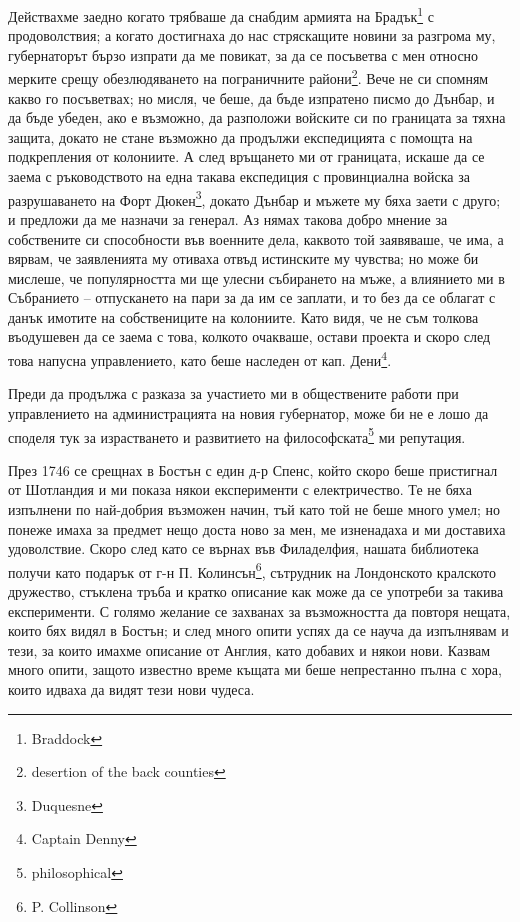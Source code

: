 \documentclass[12pt]{book}
\begin{document}
Действахме заедно когато трябваше да снабдим армията на Брадък\footnote{Braddock} с продоволствия; а когато достигнаха до нас стряскащите новини за разгрома му, губернаторът бързо изпрати да ме повикат, за да се посъветва с мен относно мерките срещу обезлюдяването на пограничните райони\footnote{desertion of the back counties}. Вече не си спомням какво го посъветвах; но мисля, че беше, да бъде изпратено писмо до Дънбар, и да бъде убеден, ако е възможно, да разположи войските си по границата за тяхна защита, докато не стане възможно да продължи експедицията с помощта на подкрепления от колониите. А след връщането ми от границата, искаше да се заема с ръководството на една такава експедиция с провинциална войска за разрушаването на Форт Дюкен\footnote{Duquesne}, докато Дънбар и мъжете му бяха заети с друго; и предложи да ме назначи за генерал. Аз нямах такова добро мнение за собствените си способности във военните дела, каквото той заявяваше, че има, а вярвам, че заявленията му отиваха отвъд истинските му чувства; но може би мислеше, че популярността ми ще улесни събирането на мъже, а влиянието ми в Събранието – отпускането на пари за да им се заплати, и то без да се облагат с данък имотите на собствениците на колониите. Като видя, че не съм толкова въодушевен да се заема с това, колкото очакваше, остави проекта и скоро след това напусна управлението, като беше наследен от кап. Дени\footnote{Captain Denny}.

Преди да продължа с разказа за участието ми в обществените работи при управлението на администрацията на новия губернатор, може би не е лошо да споделя тук за израстването и развитието на философската\footnote{philosophical} ми репутация.

През 1746 се срещнах в Бостън с един д-р Спенс, който скоро беше пристигнал от Шотландия и ми показа някои експерименти с електричество. Те не бяха изпълнени по най-добрия възможен начин, тъй като той не беше много умел; но понеже имаха за предмет нещо доста ново за мен, ме изненадаха и ми доставиха удоволствие. Скоро след като се върнах във Филаделфия, нашата библиотека получи като подарък от г-н П. Колинсън\footnote{P. Collinson}, сътрудник на Лондонското кралското дружество, стъклена тръба и кратко описание как може да се употреби за такива експерименти. С голямо желание се захванах за възможността да повторя нещата, които бях видял в Бостън; и след много опити успях да се науча да изпълнявам и тези, за които имахме описание от Англия, като добавих и някои нови. Казвам много опити, защото известно време къщата ми беше непрестанно пълна с хора, които идваха да видят тези нови чудеса. 
\end{document}
